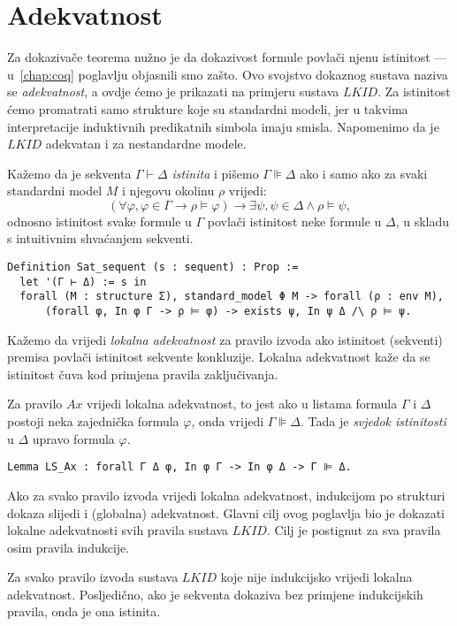 \section{Adekvatnost}\label{sec:adekvatnost}
Za dokazivače teorema nužno je da dokazivost formule povlači njenu istinitost ---
u~\ref{chap:coq} poglavlju objasnili smo zašto.
Ovo svojstvo dokaznog sustava naziva se \textit{adekvatnost},
a ovdje ćemo je prikazati na primjeru sustava \(\mathit{LKID}\).
Za istinitost ćemo promatrati samo strukture koje su standardni modeli,
jer u takvima interpretacije induktivnih predikatnih simbola imaju smisla.
Napomenimo da je \(\mathit{LKID}\) adekvatan i za nestandardne modele.

\begin{definition}
  Kažemo da je sekventa \(\Gamma \vdash \Delta\) \textit{istinita} i pišemo \(\Gamma \VDash \Delta\) ako i samo ako
  za svaki standardni model \(M\) i njegovu okolinu \(\rho\) vrijedi:
  \[
    (\forall \varphi, \varphi \in \Gamma \rightarrow \rho \vDash \varphi) \rightarrow \exists \psi, \psi \in \Delta \land \rho \vDash \psi,
  \]
  \noindent odnosno istinitost svake formule u \(\Gamma\) povlači istinitost neke formule u \(\Delta\),
  u skladu s intuitivnim shvaćanjem sekventi.
\begin{verbatim}
Definition Sat_sequent (s : sequent) : Prop :=
  let '(Γ ⊢ Δ) := s in            
  forall (M : structure Σ), standard_model Φ M -> forall (ρ : env M),
      (forall φ, In φ Γ -> ρ ⊨ φ) -> exists ψ, In ψ Δ /\ ρ ⊨ ψ.
\end{verbatim}
\end{definition}

Kažemo da vrijedi \textit{lokalna adekvatnost} za pravilo izvoda
ako istinitost (sekventi) premisa povlači istinitost sekvente konkluzije.
Lokalna adekvatnost kaže da se istinitost čuva kod primjena pravila zaključivanja.

\begin{example}
  Za pravilo \(\mathit{Ax}\) vrijedi lokalna adekvatnost,
  to jest ako u listama formula \(\Gamma\) i \(\Delta\) postoji neka zajednička formula \(\varphi\),
  onda vrijedi \(\Gamma \VDash \Delta\). Tada je \textit{svjedok istinitosti} u \(\Delta\) upravo formula \(\varphi\).
\begin{verbatim}
Lemma LS_Ax : forall Γ Δ φ, In φ Γ -> In φ Δ -> Γ ⊫ Δ.
\end{verbatim}
\end{example}

Ako za svako pravilo izvoda vrijedi lokalna adekvatnost,
indukcijom po strukturi dokaza slijedi i (globalna) adekvatnost.
Glavni cilj ovog poglavlja bio je dokazati lokalne adekvatnosti svih pravila sustava \(\mathit{LKID}\).
Cilj je postignut za sva pravila osim pravila indukcije.

\begin{theorem}
  Za svako pravilo izvoda sustava \(\mathit{LKID}\) koje nije indukcijsko vrijedi lokalna adekvatnost.
  Posljedično, ako je sekventa dokaziva bez primjene indukcijskih pravila, onda je ona istinita.
\end{theorem}

